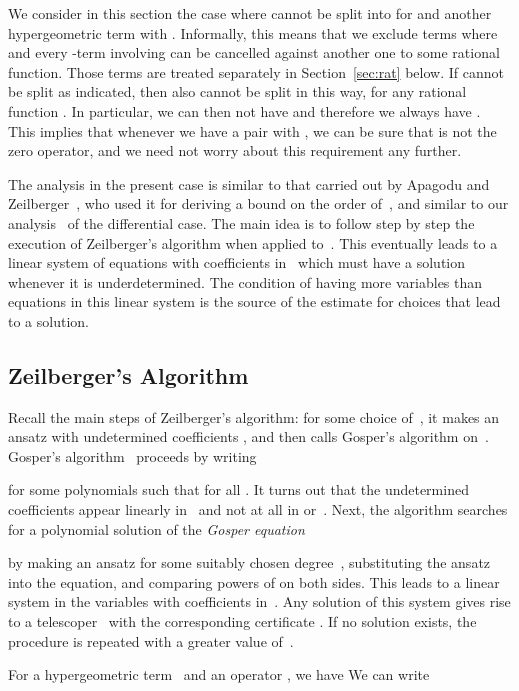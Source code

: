 \documentclass{sig-alternate}
\begin{document}
We consider in this section the case where  cannot be split into 
for  and another hypergeometric term  with
. Informally, this means that we exclude terms  where 
and every -term involving  can be cancelled against another one to
some rational function. Those terms are treated separately in
Section~\ref{sec:rat} below.  If  cannot be split as indicated, then also
 cannot be split in this way, for any rational function . In
particular, we can then not have  and therefore we always have
. This implies that whenever we have a pair  with
, we can be sure that  is not the zero operator, and we need
not worry about this requirement any further.

The analysis in the present case is similar to that carried out by
Apagodu and Zeilberger~\cite{mohammed05}, who used it for deriving a bound on the order
 of~, and similar to our analysis~\cite{chen11} of the differential case.
The main idea is to follow step by step the execution of Zeilberger's
algorithm when applied to~. This eventually leads to a linear system of
equations with coefficients in~ which must have a solution whenever it is
underdetermined. The condition of having more variables than equations in this
linear system is the source of the estimate for choices  that lead
to a solution.

\subsection{Zeilberger's Algorithm}

Recall the main steps of Zeilberger's algorithm: for some choice of~, it makes
an ansatz  with undetermined coefficients
, and then calls Gosper's algorithm on~.
Gosper's algorithm~\cite{gosper78} proceeds by writing

for some polynomials  such that  for all . It
turns out that the undetermined coefficients  appear
linearly in~ and not at all in  or~. Next, the algorithm searches for
a polynomial solution  of the \emph{Gosper equation}

by making an ansatz  for some suitably chosen
degree~, substituting the ansatz into the equation, and comparing powers of 
on both sides. This leads to a linear system in the variables
 with coefficients in~. Any solution
of this system gives rise to a telescoper~ with the corresponding certificate .
If no solution exists, the procedure is repeated with a greater value
of~.

For a hypergeometric term~ and an operator , we have {\allowdisplaybreaks
}We can write
\end{document}
